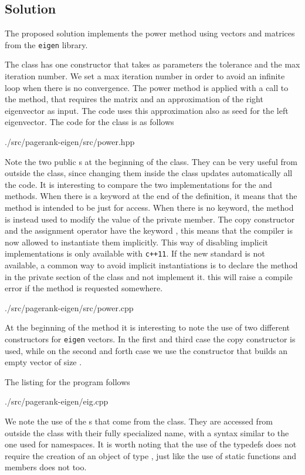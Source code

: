 \subsection*{Solution}

The proposed solution implements the power method using vectors and matrices
from the \texttt{eigen} library.

The class  has one constructor
that takes as parameters the tolerance and the max iteration number. We set
a max iteration number in order to avoid an infinite loop when there is no
convergence. The power method is applied with a call to the  method,
that requires the matrix and an approximation of the right eigenvector as
input. The code uses this approximation also as seed for the left eigenvector.
The code for the  class is as follows
%
\lstset{basicstyle=\scriptsize\sf}
    
    {./src/pagerank-eigen/src/power.hpp}
\lstset{basicstyle=\sf}

Note the two public s at the beginning of the class. They can be
very useful from outside the class, since changing them inside the class updates
automatically all the code. It is interesting to compare the two implementations
for the  and  methods. When there is a  keyword
at the end of the definition, it means that the method is intended to be just
for access. When there is no  keyword, the method is instead used to
modify the value of the private member. The copy constructor and the assignment
operator have the keyword , this means that the compiler is now
allowed to instantiate them implicitly. This way of disabling implicit
implementations is only available with \texttt{c++11}. If the new standard is
not available, a common way to avoid implicit instantiations is to declare the
method in the private section of the class and not implement it. this will raise
a compile error if the method is requested somewhere.

\lstset{basicstyle=\scriptsize\sf}
    
    {./src/pagerank-eigen/src/power.cpp}
\lstset{basicstyle=\sf}

At the beginning of the  method it is interesting to note the use of
two different constructors for \texttt{eigen} vectors. In the first and third
case the copy constructor is used, while on the second and forth case we use the
constructor that builds an empty vector of size .

The listing for the  program follows
\lstset{basicstyle=\scriptsize\sf}
    
    {./src/pagerank-eigen/eig.cpp}
\lstset{basicstyle=\sf}

We note the use of the s that come from the 
class. They are accessed from outside the class with their fully specialized
name, with a syntax similar to the one used for namespaces. It is worth noting
that the use of the typedefs does not require the creation of an object of type
, just like the use of static functions and members does not
too.

